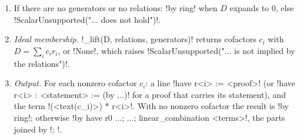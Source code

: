 {{{\begin{algorithm}
\begin{enumerate}
\begin{itemize}
\item With $\sqrt5$ present, for $5 \mid m$, $q=m/5$: $\sqrt5 - 1 - 2\omega_m^{q} -
2\omega_m^{4q}$ (\lexlean!rt_sub5!).
\item For every $\sqrt p$ with $p$ a prime other than 2, 3, 5 and every $\omega_m$ with $p\mid m$:
the quadratic Gauss-sum relation~\cite{berndt1998gauss} of \lexpy!_gauss_relation! below, when it
exists.
\item For every pair $e^{s}$, $(e^{-1})^{s}$ with the same symbolic exponent:
$e^{s}(e^{-1})^{s} - 1$, proved by \lexlean!← mul_pow, mul_inv_cancel₀, one_pow!.
\end{itemize}
\item If there are no generators or no relations: \lexcode!by ring! when $D$ expands to 0, else
\lexcode!ScalarUnsupported("... does not hold")!.
\item \emph{Ideal membership.} \lexpy!_lift(D, relations, generators)! returns cofactors $c_i$ with
$D = \sum_i c_i r_i$, or \lexpy!None!, which raises
\lexcode!ScalarUnsupported("... is not implied by the relations")!.
\item \emph{Output.} For each nonzero cofactor $c_i$: a line \lexcode!have r<i> := <proof>! (or
\lexcode!have r<i> : <statement> := (by ...)! for a proof that carries its statement), and the term
\lexcode!(<text(c_i)>) * r<i>!. With no nonzero cofactor the result is \lexcode!by ring!; otherwise
\lexcode!by have r0 ...; ...; linear_combination <terms>!, the parts joined by \lexcode!; !.
\end{enumerate}
\end{algorithm}

}}}
